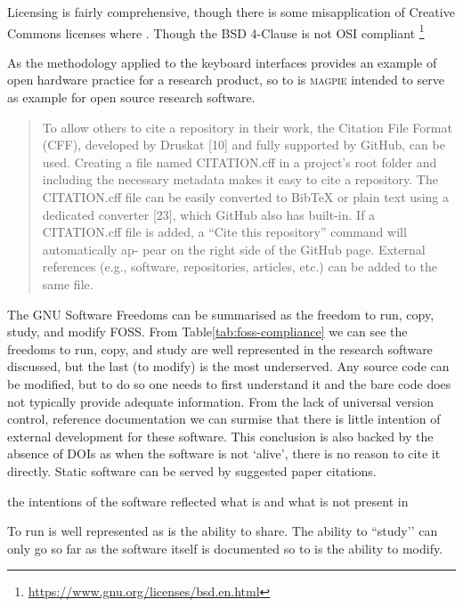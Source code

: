 Licensing is fairly comprehensive, though there is some misapplication of Creative Commons licenses where \cite{cc_can_2025,hong_choosing_2025}. Though the BSD 4-Clause is not OSI compliant 
\footnote{\url{https://www.gnu.org/licenses/bsd.en.html}}


As the methodology applied to the keyboard interfaces provides an example of open hardware practice for a research product, so to is \textsc{magpie} intended to serve as example for open source research software.








\begin{quotation}
    To allow others to cite a repository in their work, the Citation File Format (CFF), developed by Druskat [10] and fully supported by GitHub, can be used. Creating a file named CITATION.cff in a project’s root folder and including the necessary metadata makes it easy to cite a repository. The CITATION.cff file can be easily converted to BibTeX or plain text using a dedicated converter [23], which GitHub also has built-in. If a CITATION.cff file is added, a “Cite this repository” command will automatically ap- pear on the right side of the GitHub page. External references (e.g., software, repositories, articles, etc.) can be added to the same file.
\end{quotation}



The GNU Software Freedoms \cite{stallman_free_1996} can be summarised as the
freedom to run, copy, study, and modify FOSS. From Table\ref{tab:foss-compliance} we can see the freedoms to run, copy,
and study are well represented in the research software discussed, but the last (to modify)
is the most underserved. Any source code can be modified, but to do so one needs to first
understand it and the bare code does not typically provide adequate information.
From the lack of universal version control, reference documentation
we can surmise that there is little intention of external development for these software.
This conclusion is also backed by the absence of DOIs as when the software is not `alive’, there is no reason to cite it directly. Static software can be served by suggested paper citations.


the intentions of the software reflected what is and what is not
present in 


To run is well represented as is the ability to share. The ability to ``study’’
can only go so far as the software itself is documented so to is the ability to
modify. 



